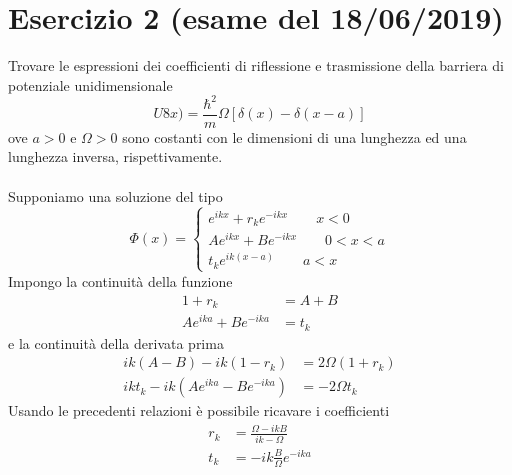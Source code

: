 \documentclass[a4paper]{article}
\begin{document}
    \section*{Esercizio 2 (esame del 18/06/2019)}
        Trovare le espressioni dei coefficienti di riflessione e trasmissione della barriera di potenziale unidimensionale
        \begin{equation*}
            U8x)=\frac{\hbar^2}{m}\Omega\left[\delta(x)-\delta(x-a)\right]
        \end{equation*}
        ove $a > 0$ e $\Omega > 0$ sono costanti con le dimensioni di una lunghezza ed una lunghezza inversa, rispettivamente.
        \\
        \\
        Supponiamo una soluzione del tipo
        \begin{equation*}
            \Phi(x)=
            \begin{cases}
                e^{ikx}+r_ke^{-ikx} \quad\quad x<0\\
                Ae^{ikx}+Be^{-ikx} \quad\quad 0<x<a\\
                t_ke^{ik(x-a)} \quad\quad a<x
            \end{cases}
        \end{equation*}
        Impongo la continuità della funzione
        \begin{equation*}
            \begin{split}
                1+r_k&=A+B\\
                Ae^{ika}+Be^{-ika}&=t_k
            \end{split}
        \end{equation*}
        e la continuità della derivata prima
        \begin{equation*}
            \begin{split}
                ik(A-B)-ik(1-r_k)&=2\Omega(1+r_k)\\
                ikt_k-ik(Ae^{ika}-Be^{-ika})&=-2\Omega t_k
            \end{split}
        \end{equation*}
        Usando le precedenti relazioni è possibile ricavare i coefficienti
        \begin{equation*}
            \begin{split}
                r_k&=\frac{\Omega-ikB}{ik-\Omega}\\
                t_k&=-ik\frac{B}{\Omega}e^{-ika}
            \end{split}
        \end{equation*}
\end{document}

